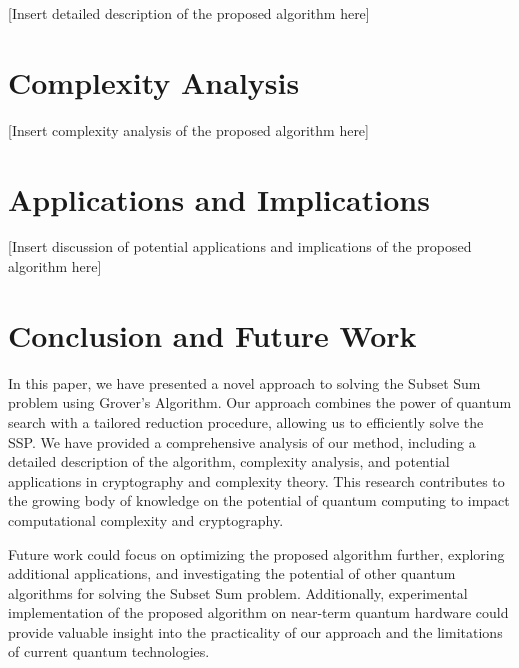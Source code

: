 [Insert detailed description of the proposed algorithm here]

\section{Complexity Analysis}\label{sec:complexity}

[Insert complexity analysis of the proposed algorithm here]

\section{Applications and Implications}\label{sec:applications}

[Insert discussion of potential applications and implications of the proposed algorithm here]

\section{Conclusion and Future Work}\label{sec:conclusion}

In this paper, we have presented a novel approach to solving the Subset Sum problem using Grover's Algorithm. Our approach combines the power of quantum search with a tailored reduction procedure, allowing us to efficiently solve the SSP. We have provided a comprehensive analysis of our method, including a detailed description of the algorithm, complexity analysis, and potential applications in cryptography and complexity theory. This research contributes to the growing body of knowledge on the potential of quantum computing to impact computational complexity and cryptography.

Future work could focus on optimizing the proposed algorithm further, exploring additional applications, and investigating the potential of other quantum algorithms for solving the Subset Sum problem. Additionally, experimental implementation of the proposed algorithm on near-term quantum hardware could provide valuable insight into the practicality of our approach and the limitations of current quantum technologies.

